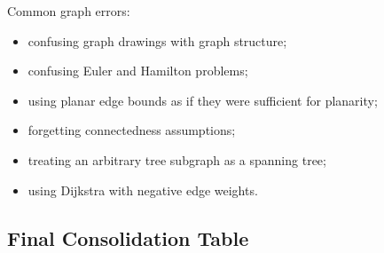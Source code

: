 \begin{commonmistake}[title={Graph theory pitfalls}]
Common graph errors:
\begin{itemize}[leftmargin=*]
    \item confusing graph drawings with graph structure;
    \item confusing Euler and Hamilton problems;
    \item using planar edge bounds as if they were sufficient for planarity;
    \item forgetting connectedness assumptions;
    \item treating an arbitrary tree subgraph as a spanning tree;
    \item using Dijkstra with negative edge weights.
\end{itemize}
\end{commonmistake}

\subsection{Final Consolidation Table}

